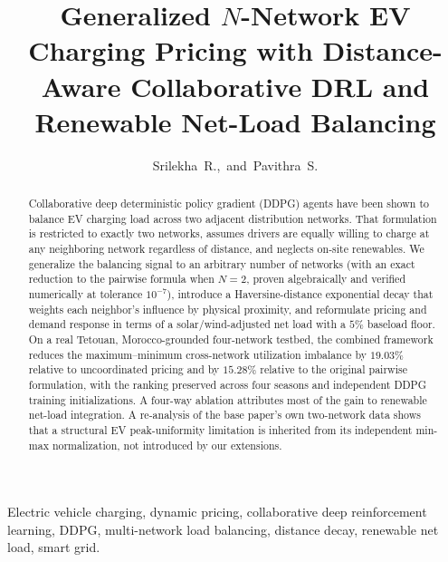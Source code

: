 \documentclass[10pt,journal]{IEEEtran}
\begin{document}
\title{Generalized $N$-Network EV Charging Pricing with Distance-Aware
Collaborative DRL and Renewable Net-Load Balancing}

\author{Srilekha~R.,~and~Pavithra~S.}

\maketitle

\begin{abstract}
Collaborative deep deterministic policy gradient (DDPG) agents have been
shown to balance EV charging load across two adjacent distribution
networks. That formulation is restricted to exactly two networks, assumes
drivers are equally willing to charge at any neighboring network
regardless of distance, and neglects on-site renewables. We generalize the
balancing signal to an arbitrary number of networks (with an exact
reduction to the pairwise formula when $N{=}2$, proven algebraically and
verified numerically at tolerance $10^{-7}$), introduce a
Haversine-distance exponential decay that weights each neighbor's influence
by physical proximity, and reformulate pricing and demand response in terms
of a solar/wind-adjusted net load with a $5\%$ baseload floor. On a real
Tetouan, Morocco-grounded four-network testbed, the combined framework
reduces the maximum--minimum cross-network utilization imbalance by
$19.03\%$ relative to uncoordinated pricing and by $15.28\%$ relative to the
original pairwise formulation, with the ranking preserved across four
seasons and independent DDPG training initializations. A four-way ablation
attributes most of the gain to renewable net-load integration. A re-analysis
of the base paper's own two-network data shows that a structural EV
peak-uniformity limitation is inherited from its independent min-max
normalization, not introduced by our extensions.
\end{abstract}

\begin{IEEEkeywords}
Electric vehicle charging, dynamic pricing, collaborative deep
reinforcement learning, DDPG, multi-network load balancing, distance decay,
renewable net load, smart grid.
\end{IEEEkeywords}
\end{document}
